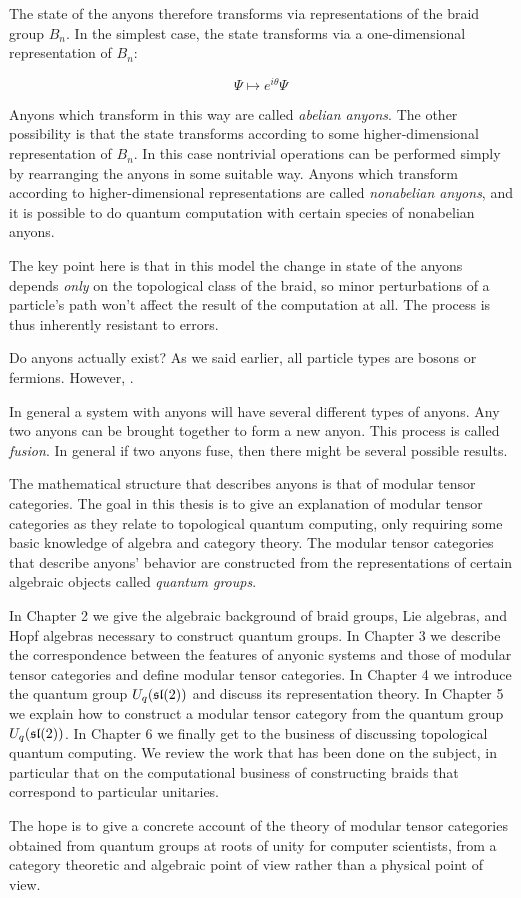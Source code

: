 The state of the anyons therefore transforms via representations of the braid
group $B_n$. In the simplest case, the state transforms via a one-dimensional
representation of $B_n$:

\begin{equation}
\Psi \mapsto e^{i\theta}\Psi
\end{equation}

Anyons which transform in this way are called \emph{abelian anyons}. The other
possibility is that the state transforms according to some higher-dimensional
representation of $B_n$. In this case nontrivial operations can be performed
simply by rearranging the anyons in some suitable way. Anyons which transform
according to higher-dimensional representations are called \emph{nonabelian
anyons}, and it is possible to do quantum computation with certain species
of nonabelian anyons.

The key point here is that in this model the change in state of the anyons
depends \emph{only} on the topological class of the braid, so minor
perturbations of a particle's path won't affect the result of the computation
at all. The process is thus inherently resistant to errors. 

Do anyons actually exist? As we said earlier, all particle types are bosons or
fermions. However, .

In general a system with anyons will have several different types of anyons.
Any two anyons can be brought together to form a new anyon. This process is
called \emph{fusion}. In general if two anyons fuse, then there might be
several possible results. 

The mathematical structure that describes anyons is that of modular tensor
categories. The goal in this thesis is to give an explanation of modular tensor
categories as they relate to topological quantum computing, only requiring some
basic knowledge of algebra and category theory. The modular tensor categories
that describe anyons' behavior are constructed from the representations of
certain algebraic objects called \emph{quantum groups}.



In Chapter 2 we give the algebraic background of braid groups, Lie algebras,
and Hopf algebras necessary to construct quantum groups. In Chapter 3 we describe the
correspondence between the features of anyonic systems and those of modular
tensor categories and define modular tensor categories.  In
Chapter 4 we introduce the quantum group $U_q(\mathfrak{sl}(2))$ and discuss its
representation theory. In
Chapter 5 we explain how to construct a modular tensor category from the
quantum group $U_q(\mathfrak{sl}(2))$. In Chapter 6 we finally get to the business of
discussing topological quantum computing. We review the work that has been done
on the subject, in particular that on the computational business of
constructing braids that correspond to particular unitaries. 

The hope is to give a concrete account of the theory of modular tensor
categories obtained from quantum groups at roots of unity for computer
scientists, from a category theoretic and algebraic point of view rather than a
physical point of view. 
